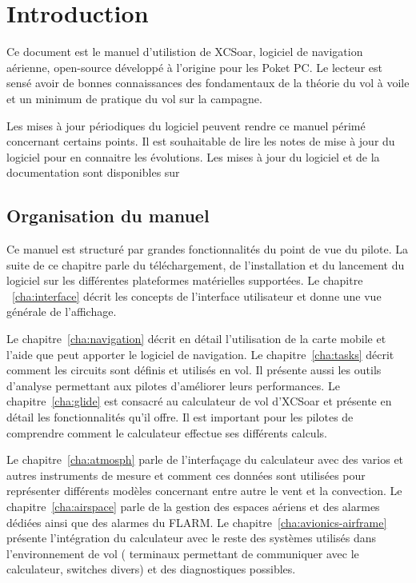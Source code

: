 \chapter{Introduction}\label{cha:introduction}
Ce document est le manuel d'utilistion de XCSoar, logiciel de navigation aérienne, open-source développé à l'origine pour les Poket PC. Le lecteur est sensé avoir de bonnes connaissances des fondamentaux de la théorie  du vol à voile et un minimum de pratique du vol sur la campagne.

Les mises à jour périodiques du logiciel peuvent rendre ce manuel périmé concernant certains points. Il est souhaitable de lire les notes de mise à jour du logiciel pour en connaitre les évolutions. Les mises à jour du logiciel et de la documentation sont disponibles sur 
\begin{quote}
\end{quote}

\section{Organisation du manuel}

Ce manuel est structuré par grandes fonctionnalités du point de vue du pilote. La suite de ce chapitre parle du téléchargement, de l'installation et du lancement du logiciel sur les différentes plateformes matérielles supportées. Le chapitre ~\ref{cha:interface} décrit les concepts de l'interface utilisateur et donne une vue générale de l'affichage.

Le chapitre~\ref{cha:navigation} décrit en détail l'utilisation de la carte mobile et l'aide que peut apporter le logiciel de navigation. Le chapitre~\ref{cha:tasks} décrit comment les circuits sont définis et utilisés en vol. Il présente aussi les outils d'analyse permettant aux pilotes d'améliorer leurs performances. Le chapitre~\ref{cha:glide}  est consacré au calculateur de vol d'XCSoar et présente en détail les fonctionnalités qu'il offre. Il est important pour les pilotes de comprendre comment le calculateur effectue ses différents calculs.

Le chapitre~\ref{cha:atmosph} parle de l'interfaçage du calculateur avec des varios et autres instruments de mesure et comment ces données sont utilisées pour représenter différents modèles concernant entre autre le vent et la convection. Le chapitre~\ref{cha:airspace} parle de la gestion des espaces aériens et des alarmes dédiées ainsi que des alarmes du FLARM. Le chapitre~\ref{cha:avionics-airframe} présente l'intégration du calculateur avec le reste des systèmes utilisés dans l'environnement de vol ( terminaux permettant de communiquer avec le calculateur, switches divers) et des diagnostiques possibles.

